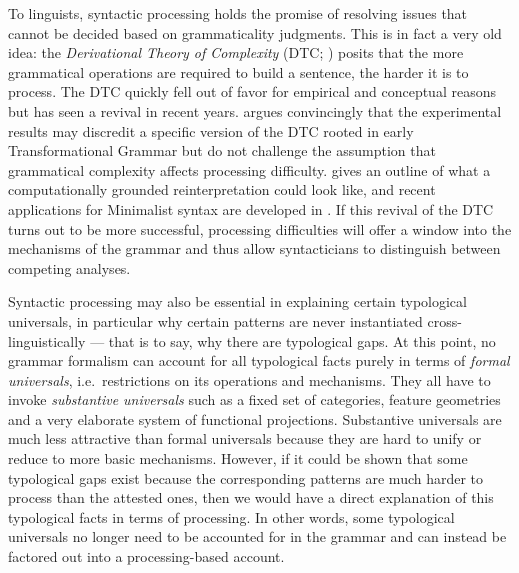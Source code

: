 To linguists, syntactic processing holds the promise of resolving issues that cannot be decided based on grammaticality judgments.
This is in fact a very old idea: the \emph{Derivational Theory of Complexity} (DTC; \citealp{MillerChomsky63,MillerMcKean64}) posits that the more grammatical operations are required to build a sentence, the harder it is to process.
The DTC quickly fell out of favor for empirical \citep{Slobin66} and conceptual reasons \citep[cf.][]{Garnham83} but has seen a revival in recent years.
\citet[Ch.5]{Phillips96} argues convincingly that the experimental results may discredit a specific version of the DTC rooted in early Transformational Grammar but do not challenge the assumption that grammatical complexity affects processing difficulty.
\citet{Hale11} gives an outline of what a computationally grounded reinterpretation could look like, and recent applications for Minimalist syntax are developed in \citet{Kobele.etal12, GrafMarcinek14CMCL, GrafEtAl15MOL}.
If this revival of the DTC turns out to be more successful, processing difficulties will offer a window into the mechanisms of the grammar and thus allow syntacticians to distinguish between competing analyses.

Syntactic processing may also be essential in explaining certain typological universals, in particular why certain patterns are never instantiated cross-linguistically --- that is to say, why there are typological gaps.
At this point, no grammar formalism can account for all typological facts purely in terms of \emph{formal universals}, i.e.\ restrictions on its operations and mechanisms.
They all have to invoke \emph{substantive universals} such as a fixed set of categories, feature geometries and a very elaborate system of functional projections.
Substantive universals are much less attractive than formal universals because they are hard to unify or reduce to more basic mechanisms.
However, if it could be shown that some typological gaps exist because the corresponding patterns are much harder to process than the attested ones, then we would have a direct explanation of this typological facts in terms of processing.
In other words, some typological universals no longer need to be accounted for in the grammar and can instead be factored out into a processing-based account.







